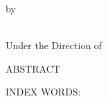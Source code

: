 \pagestyle{empty}
\begin{center}



\vspace{1in}
by\\
\vspace{1in}

\\

\vspace{1.8in}
Under the Direction of \\
\vspace{.7in}

\newpage
ABSTRACT\\
\bigskip
\end{center}

\begin{doublespace}
\end{doublespace}

\begin{singlespace}

\noindent INDEX WORDS:
\hspace{0.2in}
\parbox[t]{5 in}{}

\end{singlespace}
